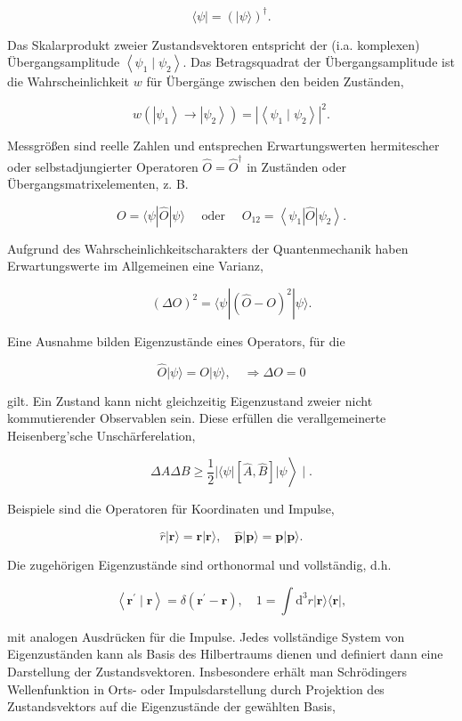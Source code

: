 \documentclass[10pt, letterpaper]{article}
\begin{document}
$$
\langle\psi|=(|\psi\rangle)^{\dagger} .
$$

Das Skalarprodukt zweier Zustandsvektoren entspricht der (i.a. komplexen) Übergangsamplitude $\left\langle\psi_{1} \mid \psi_{2}\right\rangle$. Das Betragsquadrat der Übergangsamplitude ist die Wahrscheinlichkeit $w$ für Übergänge zwischen den beiden Zuständen,

$$
w\left(\left|\psi_{1}\right\rangle \rightarrow\left|\psi_{2}\right\rangle\right)=\left|\left\langle\psi_{1} \mid \psi_{2}\right\rangle\right|^{2} .
$$

Messgrößen sind reelle Zahlen und entsprechen Erwartungswerten hermitescher oder selbstadjungierter Operatoren $\hat{O}=\hat{O}^{\dagger}$ in Zuständen oder Übergangsmatrixelementen, z. B.

$$
O=\langle\psi| \hat{O}|\psi\rangle \quad \text { oder } \quad O_{12}=\left\langle\psi_{1}\right| \hat{O}\left|\psi_{2}\right\rangle .
$$

Aufgrund des Wahrscheinlichkeitscharakters der Quantenmechanik haben Erwartungswerte im Allgemeinen eine Varianz,

$$
(\Delta O)^{2}=\langle\psi|(\hat{O}-O)^{2}|\psi\rangle .
$$

Eine Ausnahme bilden Eigenzustände eines Operators, für die

$$
\hat{O}|\psi\rangle=O|\psi\rangle, \quad \Rightarrow \Delta O=0
$$

gilt. Ein Zustand kann nicht gleichzeitig Eigenzustand zweier nicht kommutierender Observablen sein. Diese erfüllen die verallgemeinerte Heisenberg'sche Unschärferelation,

$$
\left.\Delta A \Delta B \geqslant \frac{1}{2}|\langle\psi|[\hat{A}, \hat{B}]| \psi\right\rangle \mid .
$$

Beispiele sind die Operatoren für Koordinaten und Impulse,

$$
\hat{r}|\mathbf{r}\rangle=\mathbf{r}|\mathbf{r}\rangle, \quad \hat{\mathbf{p}}|\mathbf{p}\rangle=\mathbf{p}|\mathbf{p}\rangle .
$$

Die zugehörigen Eigenzustände sind orthonormal und vollständig, d.h.

$$
\left\langle\mathbf{r}^{\prime} \mid \mathbf{r}\right\rangle=\delta\left(\mathbf{r}^{\prime}-\mathbf{r}\right), \quad 1=\int \mathrm{d}^{3} r|\mathbf{r}\rangle\langle\mathbf{r}|,
$$

mit analogen Ausdrücken für die Impulse. Jedes vollständige System von Eigenzuständen kann als Basis des Hilbertraums dienen und definiert dann eine Darstellung der Zustandsvektoren. Insbesondere erhält man Schrödingers Wellenfunktion in Orts- oder Impulsdarstellung durch Projektion des Zustandsvektors auf die Eigenzustände der gewählten Basis,
\end{document}
